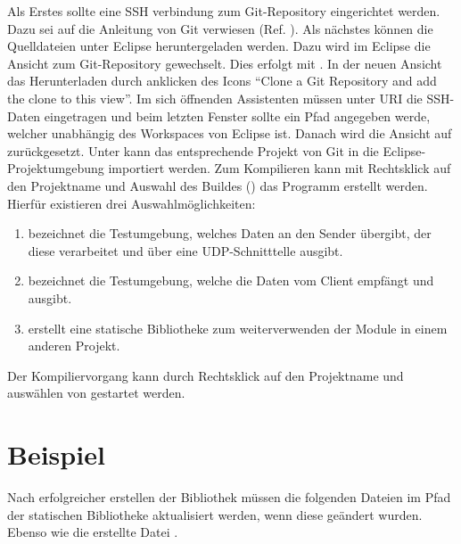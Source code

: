 Als Erstes sollte eine SSH verbindung zum Git-Repository eingerichtet werden.
Dazu sei auf die Anleitung von Git verwiesen
(Ref. \cite{web7}). Als n{\"a}chstes k{\"o}nnen
die Quelldateien unter Eclipse heruntergeladen werden. Dazu wird im Eclipse die
Ansicht zum Git-Repository gewechselt. Dies erfolgt mit . In der neuen Ansicht das Herunterladen durch anklicken des
Icons "`Clone a Git Repository and add the clone to this view"'. Im sich {\"o}ffnenden
Assistenten m{\"u}ssen unter URI die SSH-Daten
 eingetragen und
beim letzten Fenster sollte ein Pfad angegeben werde, welcher
unabh{\"a}ngig des Workspaces von Eclipse ist.\newline
Danach wird die Ansicht auf 
zur{\"u}ckgesetzt. Unter  kann das entsprechende Projekt von Git
in die Eclipse-Projektumgebung importiert werden. Zum Kompilieren kann
mit Rechtsklick auf den Projektname und Auswahl des Buildes () das Programm erstellt werden. Hierf{\"u}r existieren
drei Auswahlm{\"o}glichkeiten:

\begin{enumerate}
\item {} bezeichnet die Testumgebung, welches
Daten an den Sender {\"u}bergibt, der diese verarbeitet und {\"u}ber eine UDP-Schnitttelle ausgibt. 
\item {} bezeichnet die Testumgebung, welche die
Daten vom Client empf{\"a}ngt und ausgibt.
\item {} erstellt eine statische Bibliotheke zum weiterverwenden der
Module in einem anderen Projekt.
\end{enumerate}

Der Kompiliervorgang kann durch Rechtsklick auf den Projektname und ausw{\"a}hlen
von  gestartet werden.

\section{Beispiel}

Nach erfolgreicher erstellen der Bibliothek m{\"u}ssen die folgenden Dateien
im Pfad  der statischen Bibliotheke aktualisiert werden,
wenn diese ge{\"a}ndert wurden. Ebenso wie die erstellte Datei
.

